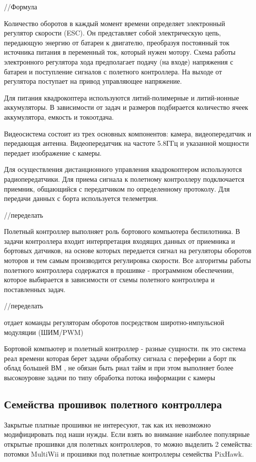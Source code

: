 //Формула 

Количество оборотов в каждый момент времени определяет электронный регулятор скорости (ESC). Он представляет собой электрическую цепь, передающую энергию от батареи к двигателю, преобразуя постоянный ток источника питания в переменный ток, который нужен мотору. Схема работы электронного регулятора хода предполагает подачу (на входе) напряжения с батареи и поступление сигналов с полетного контроллера. На выходе от регулятора поступает на привод управляющее напряжение. 

Для питания квадрокоптера используются литий-полимерные и литий-ионные аккумуляторы. В зависимости от задач и размеров подбирается количество ячеек аккумулятора, емкость и токоотдача.

Видеосистема состоит из трех основных компонентов: камера, видеопередатчик и передающая антенна.
Видеопередатчик на частоте 5.8ГГц и указанной мощности передает изображение с камеры.

Для осуществления дистанционного управления квадрокоптером используются радиопередатчики. Для приема сигнала к полетному контроллеру подключается приемник, общающийся с передатчиком по определенному протоколу. Для передачи данных с борта используется телеметрия.

//переделать

Полетный контроллер выполняет роль бортового компьютера беспилотника. В задачи контроллера входит интерпретация входящих данных от приемника и бортовых датчиков, на основе которых передается сигнал на регуляторы оборотов моторов и тем самым производится регулировка скорости. Все алгоритмы работы полетного контроллера содержатся в прошивке - программном обеспечении, которое выбирается в зависимости от схемы полетного контроллера и поставленных задач.

//переделать

отдает команды регуляторам оборотов посредством широтно-импульсной модуляции (ШИМ/PWM)

Бортовой компьютер и полетный контроллер - разные сущности.
пк это система реал времени которая берет задачи обработку сигнала с переферии
а борт пк облад большей ВМ , не обязан быть риал тайм и при этом выполняет более высокоуровне задачи по типу обработка потока информации с камеры

\subsection{Семейства прошивок полетного контроллера}
Закрытые платные прошивки не интересуют, так как их невозможно модифицировать под наши нужды. Если взять во внимание наиболее популярные открытые прошивки для полетных контроллеров, то можно выделить 2 семейства: потомки MultiWii и прошивки под полетные контроллеры семейства PixHawk.

